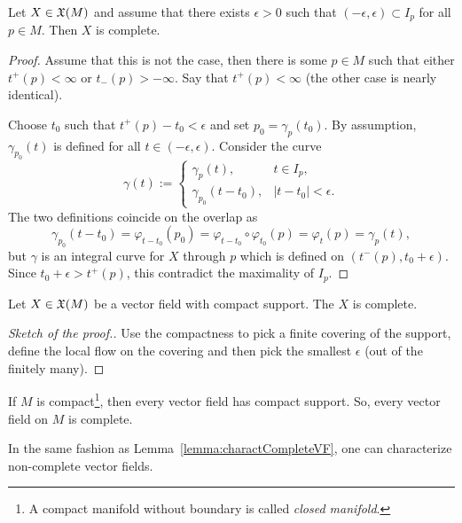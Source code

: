 \begin{lemma}\label{lemma:charactCompleteVF}
  Let $X\in\mathfrak{X}(M)$ and assume that there exists $\epsilon >0$ such that $(-\epsilon, \epsilon)\subset I_p$ for all $p \in M$.
  Then $X$ is complete.
\end{lemma}
\begin{proof}
  Assume that this is not the case, then there is some $p\in M$ such that either $t^+(p) < \infty$ or $t_-(p)>-\infty$.
  Say that $t^+(p) < \infty$ (the other case is nearly identical).
  
  Choose $t_0$ such that $t^+(p) - t_0 < \epsilon$ and set $p_0 = \gamma_p(t_0)$. By assumption, $\gamma_{p_0}(t)$ is defined for all $t\in(-\epsilon, \epsilon)$. Consider the curve
  \begin{equation}
    \gamma(t) := \begin{cases}
      \gamma_p(t), & t\in I_p,\\
      \gamma_{p_0}(t-t_0), & |t-t_0|<\epsilon.
    \end{cases}
  \end{equation}
  The two definitions coincide on the overlap as
  \begin{equation}
    \gamma_{p_0}(t-t_0) = \varphi_{t-t_0}(p_0) = \varphi_{t-t_0}\circ\varphi_{t_0}(p) = \varphi_t(p) = \gamma_p(t),
  \end{equation}
  but $\gamma$ is an integral curve for $X$ through $p$ which is defined on $(t^-(p), t_0+\epsilon)$.
  Since $t_0 + \epsilon > t^+(p)$, this contradict the maximality of $I_p$.
\end{proof}

\begin{corollary}
  Let $X\in\mathfrak{X}(M)$ be a vector field with compact support. The $X$ is complete.
\end{corollary}
\begin{proof}[Sketch of the proof.]
  Use the compactness to pick a finite covering of the support, define the local flow on the covering and then pick the smallest $\epsilon$ (out of the finitely many).
\end{proof}

\begin{corollary}
  If $M$ is compact\footnote{A compact manifold without boundary is called \emph{closed manifold}.}, then every vector field has compact support.
  So, every vector field on $M$ is complete.
\end{corollary}

In the same fashion as Lemma~\ref{lemma:charactCompleteVF}, one can characterize non-complete vector fields.

